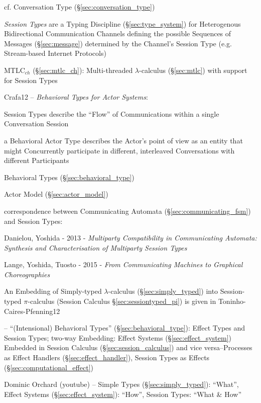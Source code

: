 \fist cf. Conversation Type (\S\ref{sec:conversation_type})

\emph{Session Types} are a Typing Discipline (\S\ref{sec:type_system})
for Heterogenous Bidirectional Communication Channels defining the
possible Sequences of Messages (\S\ref{sec:message}) determined by the
Channel's Session Type (e.g. Stream-based Internet Protocols)
\cite{neubauer-thiemann04}

\fist MTLC$_{ch}$ (\S\ref{sec:mtlc_ch}): Multi-threaded
$\lambda$-calculus (\S\ref{sec:mtlc}) with support for Session Types

Crafa12 -- \emph{Behavioral Types for Actor Systems}:

Session Types describe the ``Flow'' of Communications within a single
Conversation Session

a Behavioral Actor Type describes the Actor's point of view as an
entity that might Concurrently participate in different, interleaved
Conversations with different Participants

Behavioral Types (\S\ref{sec:behavioral_type})

\fist Actor Model (\S\ref{sec:actor_model})

\asterism


correspondence between Communicating Automata
(\S\ref{sec:communicating_fsm}) and Session Types:

Danielou, Yoshida - 2013 - \emph{Multiparty Compatibility in
  Communicating Automata: Synthesis and Characterisation of Multiparty
  Session Types}

Lange, Yoshida, Tuosto - 2015 -
\emph{From Communicating Machines to Graphical Choreographies}


\asterism


An Embedding of Simply-typed $\lambda$-calculus
(\S\ref{sec:simply_typed}) into Session-typed $\pi$-calculus (Session
Calculus \S\ref{sec:sessiontyped_pi}) is given in
Toninho-Caires-Pfenning12 \cite{caires-pfenning-toninho12}

\cite{orchard-yoshida16} -- ``(Intensional) Behavioral Types''
(\S\ref{sec:behavioral_type}): Effect Types and Session Types; two-way
Embedding: Effect Systems (\S\ref{sec:effect_system}) Embedded in
Session Calculus (\S\ref{sec:session_calculus}) and vice
versa--Processes as Effect Handlers (\S\ref{sec:effect_handler}),
Session Types as Effects (\S\ref{sec:computational_effect})

Dominic Orchard (youtube) -- Simple Types (\S\ref{sec:simply_typed}):
``What'', Effect Systems (\S\ref{sec:effect_system}): ``How'', Session
Types: ``What \& How''

